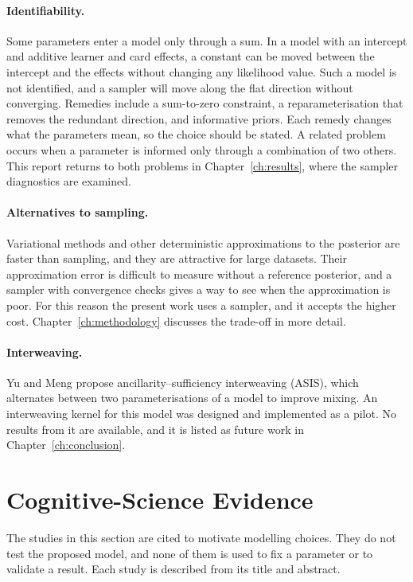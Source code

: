 \paragraph{Identifiability.}
Some parameters enter a model only through a sum. In a model with an intercept and additive learner and card
effects, a constant can be moved between the intercept and the effects without changing any likelihood value.
Such a model is not identified, and a sampler will move along the flat direction without converging. Remedies
include a sum-to-zero constraint, a reparameterisation that removes the redundant direction, and informative
priors. Each remedy changes what the parameters mean, so the choice should be stated. A related problem occurs
when a parameter is informed only through a combination of two others. This report returns to both problems in
Chapter~\ref{ch:results}, where the sampler diagnostics are examined.

\paragraph{Alternatives to sampling.}
Variational methods and other deterministic approximations to the posterior are faster than sampling, and they
are attractive for large datasets. Their approximation error is difficult to measure without a reference
posterior, and a sampler with convergence checks gives a way to see when the approximation is poor. For this
reason the present work uses a sampler, and it accepts the higher cost. Chapter~\ref{ch:methodology} discusses
the trade-off in more detail.

\paragraph{Interweaving.}
Yu and Meng \cite{yu2011interweaving} propose ancillarity--sufficiency interweaving (ASIS), which
alternates between two parameterisations of a model to improve mixing. An interweaving kernel for this
model was designed and implemented as a pilot. No results from it are available, and it is listed as
future work in Chapter~\ref{ch:conclusion}.

\section{Cognitive-Science Evidence}
\label{sec:lit-cognitive}

The studies in this section are cited to motivate modelling choices. They do not test the proposed model, and
none of them is used to fix a parameter or to validate a result. Each study is described from its title and
abstract.

